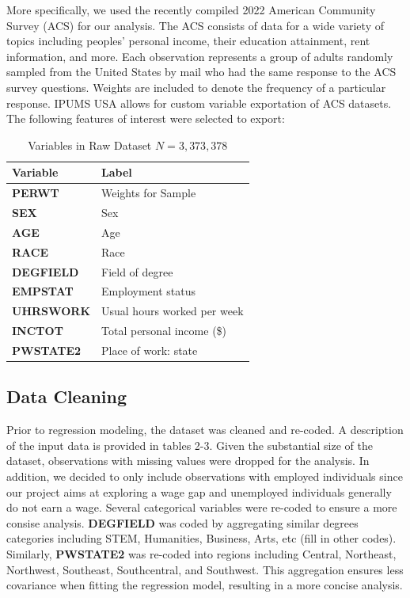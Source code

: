 \documentclass{article}
\begin{document}
More specifically, we used the recently compiled 2022 American Community Survey (ACS) for our analysis. The ACS consists of data for a wide variety of topics including peoples’ personal income, their education attainment, rent information, and more. Each observation represents a group of adults randomly sampled from the United States by mail who had the same response to the ACS survey questions. Weights are included to denote the frequency of a particular response. IPUMS USA allows for custom variable exportation of ACS datasets. The following features of interest were selected to export:
\vspace{\baselineskip}
\vspace{\baselineskip}

\begin{table}[!h]
    \centering
    \begin{tabular}{lp{6cm}}
        \toprule
        \textbf{Variable} & \textbf{Label} \\
        \midrule
        \textbf{PERWT} & Weights for Sample \\
        \textbf{SEX} & Sex \\
        \textbf{AGE} & Age \\
        \textbf{RACE} & Race \\
        \textbf{DEGFIELD} & Field of degree \\
        \textbf{EMPSTAT} & Employment status \\
        \textbf{UHRSWORK} & Usual hours worked per week \\
        \textbf{INCTOT} & Total personal income (\$) \\
        \textbf{PWSTATE2} & Place of work: state \\
        \bottomrule
    \end{tabular}
    \caption{Variables in Raw Dataset $N= 3,373,378$}
    \label{table:variables}
\end{table}

\subsection*{Data Cleaning}
Prior to regression modeling, the dataset was cleaned and re-coded. A description of the input data is provided in tables 2-3. Given the substantial size of the dataset, observations with missing values were dropped for the analysis. In addition, we decided to only include observations with employed individuals since our project aims at exploring a wage gap and unemployed individuals generally do not earn a wage. Several categorical variables were re-coded to ensure a more consise analysis. \textbf{DEGFIELD} was coded by aggregating similar degrees categories including STEM, Humanities, Business, Arts, etc (fill in other codes). Similarly, \textbf{PWSTATE2} was re-coded into regions including Central, Northeast, Northwest, Southeast, Southcentral,  and Southwest. This aggregation ensures less covariance when fitting the regression model, resulting in a more concise analysis. 
\\
\end{document}
